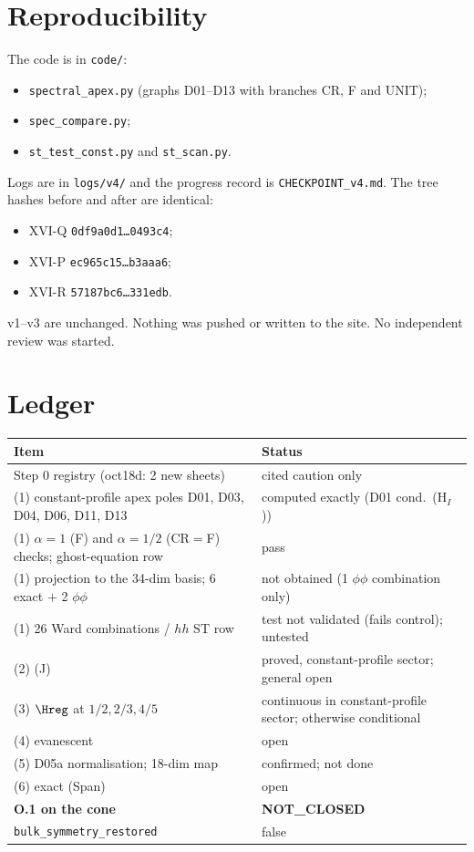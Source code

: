 \section{Reproducibility}
The code is in \texttt{code/}:
\begin{itemize}
\item \texttt{spectral\_apex.py} (graphs D01--D13 with branches CR, F and UNIT);
\item \texttt{spec\_compare.py};
\item \texttt{st\_test\_const.py} and \texttt{st\_scan.py}.
\end{itemize}
Logs are in \texttt{logs/v4/} and the progress record is \texttt{CHECKPOINT\_v4.md}. The tree hashes before and after are identical:
\begin{itemize}
\item XVI-Q \texttt{0df9a0d1\dots0493c4};
\item XVI-P \texttt{ec965c15\dots b3aaa6};
\item XVI-R \texttt{57187bc6\dots331edb}.
\end{itemize}
v1--v3 are unchanged. Nothing was pushed or written to the site. No independent review was started.

\section{Ledger}
\begin{longtable}{p{}p{}}\toprule
Item & Status\\\midrule
Step 0 registry (oct18d: 2 new sheets) & cited caution only\\
(1) constant-profile apex poles D01, D03, D04, D06, D11, D13 & computed exactly (D01 cond.\ (H$_I$))\\
(1) $\alpha=1$ (F) and $\alpha=1/2$ (CR$=$F) checks; ghost-equation row & pass\\
(1) projection to the 34-dim basis; 6 exact $+$ 2 $\phi\phi$ & not obtained (1 $\phi\phi$ combination only)\\
(1) 26 Ward combinations / $hh$ ST row & test not validated (fails control); untested\\
(2) (J) & proved, constant-profile sector; general open\\
(3) $\Hreg$ at $1/2,2/3,4/5$ & continuous in constant-profile sector; otherwise conditional\\
(4) evanescent & open\\
(5) D05a normalisation; 18-dim map & confirmed; not done\\
(6) exact (Span) & open\\\midrule
\textbf{O.1 on the cone} & \textbf{NOT\_CLOSED}\\
\texttt{bulk\_symmetry\_restored} & false\\\bottomrule
\end{longtable}

